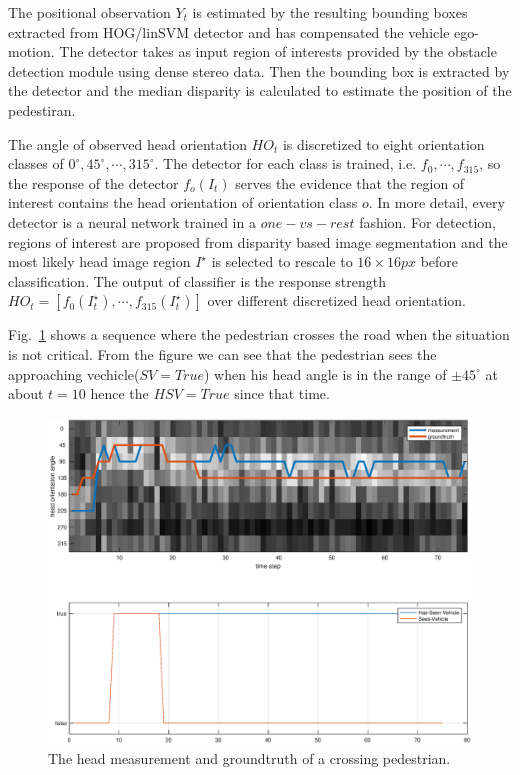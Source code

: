 \documentclass[10pt,twocolumn,letterpaper]{article}
\begin{document}
    The positional observation $Y_t$ is estimated by the resulting bounding boxes extracted from 
    HOG/linSVM detector and has compensated the vehicle ego-motion. The detector takes as input
    region of interests provided by the obstacle detection module using dense stereo data. Then
    the bounding box is extracted by the detector and the median disparity is calculated to 
    estimate the position of the pedestiran.

    The angle of observed head orientation $HO_t$ is discretized to eight orientation classes
    of $0^\circ, 45^\circ,\cdots, 315^\circ$. The detector for each class is trained, i.e. 
    $f_0,\cdots, f_{315}$, so the response of the detector $f_o(I_t)$ serves the evidence
    that the region of interest contains the head orientation of orientation class $o$.
    In more detail, every detector is a neural network trained in a $one-vs-rest$ fashion.
    For detection, regions of interest are proposed 
    from disparity based image segmentation and the most likely head image region $I^\star$
    is selected to rescale to $16 \times 16px$ before classification. The output of classifier
    is the response strength $HO_t = [f_0(I_t^{\star}), \cdots, f_{315}(I_t^{\star})]$ over 
    different discretized head orientation.

    Fig.~\ref{head_measure} shows a sequence where the pedestrian crosses the road 
    when the situation is not critical. From the figure we can see that the pedestrian
    sees the approaching vechicle($SV=True$) when his head angle is in the range of
    $\pm 45^{\circ}$ at about $t=10$ hence the $HSV = True$ since that time.   

    \begin{figure}[t]
        \begin{center}
           \includegraphics[width=1.1\linewidth]{images/ho.eps}
        \end{center}
           \caption{The head measurement and groundtruth of a crossing pedestrian.}
        \label{fig:long}
        \label{fig:onecol}
        \label{head_measure}
    \end{figure} 
  
\end{document}
